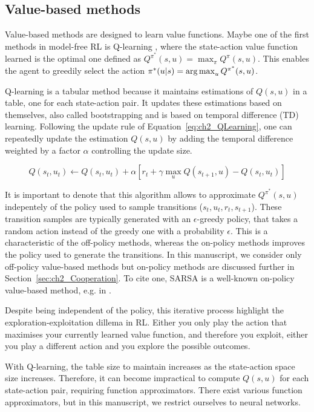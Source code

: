 \subsection{Value-based methods} \label{sec:ch2_value_based_methods}
Value-based methods are designed to learn value functions.
Maybe one of the first methods in model-free RL is Q-learning \citep{watkins1992q}, where the state-action value function learned is the optimal one defined as $Q^{\pi^*}(s, u)=\max_{\pi}Q^\pi(s, u)$.
This enables the agent to greedily select the action $\pi^*(u|s)=\operatorname*{arg\,max}_u Q^{\pi^*}(s, u)$.

Q-learning is a tabular method because it maintains estimations of $Q(s, u)$ in a table, one for each state-action pair.
It updates these estimations based on themselves, also called bootstrapping and is based on temporal difference (TD) learning.
Following the update rule of Equation~\ref{eq:ch2_QLearning}, one can repeatedly update the estimation $Q(s, u)$ by adding the temporal difference weighted by a factor $\alpha$ controlling the update size.

\begin{equation}
\label{eq:ch2_QLearning}
    Q(s_t, u_t) \leftarrow Q(s_t, u_t) + \alpha \left[ r_t + \gamma \max_u Q(s_{t+1}, u) - Q(s_t, u_t) \right]
\end{equation}

It is important to denote that this algorithm allows to approximate $Q^{\pi^*}(s, u)$ indepentely of the policy used to sample transitions ($s_t, u_t, r_t, s_{t+1}$).
These transition samples are typically generated with an $\epsilon$-greedy policy, that takes a random action instead of the greedy one with a probability $\epsilon$.
This is a characteristic of the off-policy methods, whereas the on-policy methods improves the policy used to generate the transitions.
In this manuscript, we consider only off-policy value-based methods but on-policy methods are discussed further in Section~\ref{sec:ch2_Cooperation}.
To cite one, SARSA is a well-known on-policy value-based method, e.g. in \citep{sutton2018reinforcement}.

Despite being independent of the policy, this iterative process highlight the exploration-exploitation dillema in RL.
Either you only play the action that maximises your currently learned value function, and therefore you exploit, either you play a different action and you explore the possible outcomes.

With Q-learning, the table size to maintain increases as the state-action space size increases.
Therefore, it can become impractical to compute $Q(s, u)$ for each state-action pair, requiring function approximators.
There exist various function approximators, but in this manuscript, we restrict ourselves to neural networks.

